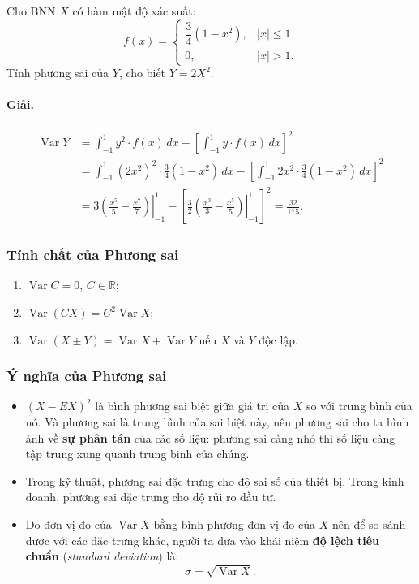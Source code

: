 \begin{vidu}[VD 17]
Cho BNN $X$ có hàm mật độ xác suất:
\[
f(x) = \begin{cases}
\dfrac{3}{4}(1 - x^2), & |x| \le 1 \\
0, & |x| > 1.
\end{cases}
\]
Tính phương sai của $Y$, cho biết $Y = 2X^2$.

\paragraph{Giải.}
\begin{align*}
\operatorname{Var} Y &= \int_{-1}^1 y^2 \cdot f(x)\,dx - \left[\int_{-1}^1 y \cdot f(x)\,dx\right]^2 \\
&= \int_{-1}^1 (2x^2)^2 \cdot \frac{3}{4}(1 - x^2)\,dx - \left[\int_{-1}^1 2x^2 \cdot \frac{3}{4}(1 - x^2)\,dx\right]^2 \\
&= 3\left.\left(\frac{x^5}{5} - \frac{x^7}{7}\right)\right|_{-1}^1 - \left[\frac{3}{2}\left.\left(\frac{x^3}{3} - \frac{x^5}{5}\right)\right|_{-1}^1\right]^2 = \frac{32}{175}.
\end{align*}
\end{vidu}

\subsubsection{Tính chất của Phương sai}
\begin{enumerate}[label=\arabic*)]
    \item $\operatorname{Var} C = 0$, $C \in \mathbb{R}$;
    \item $\operatorname{Var}(CX) = C^2 \operatorname{Var} X$;
    \item $\operatorname{Var}(X \pm Y) = \operatorname{Var} X + \operatorname{Var} Y$ nếu $X$ và $Y$ độc lập.
\end{enumerate}

\subsubsection{Ý nghĩa của Phương sai}
\begin{itemize}
    \item $(X - EX)^2$ là bình phương sai biệt giữa giá trị của $X$ so với trung bình của nó. Và phương sai là trung bình của sai biệt này, nên phương sai cho ta hình ảnh về \textbf{sự phân tán} của các số liệu: phương sai càng nhỏ thì số liệu càng tập trung xung quanh trung bình của chúng.
    \item Trong kỹ thuật, phương sai đặc trưng cho độ sai số của thiết bị. Trong kinh doanh, phương sai đặc trưng cho độ rủi ro đầu tư.
    \item Do đơn vị đo của $\operatorname{Var} X$ bằng bình phương đơn vị đo của $X$ nên để so sánh được với các đặc trưng khác, người ta đưa vào khái niệm \textbf{độ lệch tiêu chuẩn} (\textit{standard deviation}) là:
    \[
    \sigma = \sqrt{\operatorname{Var} X}.
    \]
\end{itemize}


